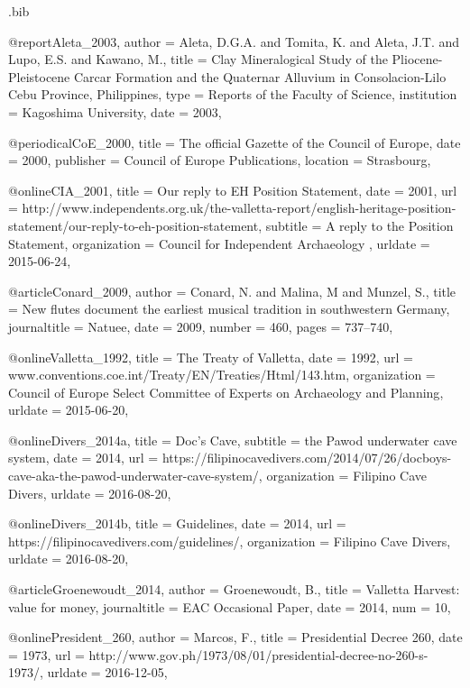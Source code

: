 \begin{filecontents}{\IJSRAidentifier.bib}

@report{Aleta_2003,
	author = {Aleta, D.G.A. and Tomita, K. and Aleta, J.T. and Lupo, E.S. and Kawano, M.},
	title = {Clay Mineralogical Study of the Pliocene-Pleistocene Carcar Formation and the Quaternar Alluvium in Consolacion-Lilo Cebu Province, Philippines},
	type = {Reports of the Faculty of Science},
	institution = {Kagoshima University},
	date = {2003},
}

@periodical{CoE_2000,
	title = {The official Gazette of the Council of Europe},
	date = {2000},
	publisher = {Council of Europe Publications},
	location = {Strasbourg},
}

@online{CIA_2001,
	title = {Our reply to EH Position Statement},
	date = {2001},
	url = {http://www.independents.org.uk/the-valletta-report/english-heritage-position-statement/our-reply-to-eh-position-statement},
	subtitle = {A reply to the Position Statement},
	organization = {Council for Independent Archaeology },
	urldate = {2015-06-24},
}

@article{Conard_2009,
	author = {Conard, N. and Malina, M and Munzel, S.},
	title = {New flutes document the earliest musical tradition in southwestern Germany},
	journaltitle = {Natuee},
	date = {2009},
	number = {460},
	pages = {737--740},
}

@online{Valletta_1992,
	title = {The Treaty of Valletta},
	date = {1992},
	url = {www.conventions.coe.int/Treaty/EN/Treaties/Html/143.htm},
	organization = {Council of Europe Select Committee of Experts on Archaeology and Planning},
	urldate = {2015-06-20},
}

@online{Divers_2014a,
	title = {Doc’s Cave},
	subtitle = {the Pawod underwater cave system},
	date = {2014},
	url = {https://filipinocavedivers.com/2014/07/26/docboys-cave-aka-the-pawod-underwater-cave-system/},
	organization = {Filipino Cave Divers},
	urldate = {2016-08-20},
}

@online{Divers_2014b,
	title = {Guidelines},
	date = {2014},
	url = {https://filipinocavedivers.com/guidelines/},
	organization = {Filipino Cave Divers},
	urldate = {2016-08-20},
}

@article{Groenewoudt_2014,
	author = {Groenewoudt, B.},
	title = {Valletta Harvest: value for money},
	journaltitle = {EAC Occasional Paper},
	date = {2014},
	num = {10},
}

@online{President_260,
	author = {Marcos, F.},
	title = {Presidential Decree 260},
	date = {1973},
	url = {http://www.gov.ph/1973/08/01/presidential-decree-no-260-s-1973/},
	urldate = {2016-12-05},
}


\end{filecontents}
